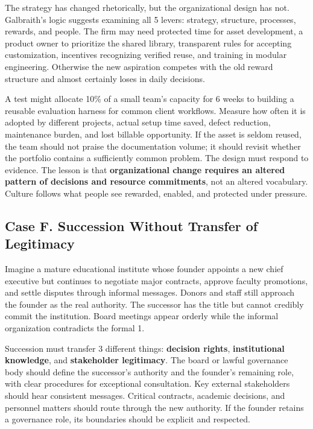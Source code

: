 The strategy has changed rhetorically, but the organizational design has not. Galbraith's logic suggests examining all 5 levers: strategy, structure, processes, rewards, and people. The firm may need protected time for asset development, a product owner to prioritize the shared library, transparent rules for accepting customization, incentives recognizing verified reuse, and training in modular engineering. Otherwise the new aspiration competes with the old reward structure and almost certainly loses in daily decisions.

A test might allocate 10\% of a small team's capacity for 6 weeks to building a reusable evaluation harness for common client workflows. Measure how often it is adopted by different projects, actual setup time saved, defect reduction, maintenance burden, and lost billable opportunity. If the asset is seldom reused, the team should not praise the documentation volume; it should revisit whether the portfolio contains a sufficiently common problem. The design must respond to evidence. The lesson is that \textbf{organizational change requires an altered pattern of decisions and resource commitments}, not an altered vocabulary. Culture follows what people see rewarded, enabled, and protected under pressure.

\subsection*{Case F. Succession Without Transfer of Legitimacy}

Imagine a mature educational institute whose founder appoints a new chief executive but continues to negotiate major contracts, approve faculty promotions, and settle disputes through informal messages. Donors and staff still approach the founder as the real authority. The successor has the title but cannot credibly commit the institution. Board meetings appear orderly while the informal organization contradicts the formal 1.

Succession must transfer 3 different things: \textbf{decision rights}, \textbf{institutional knowledge}, and \textbf{stakeholder legitimacy}. The board or lawful governance body should define the successor's authority and the founder's remaining role, with clear procedures for exceptional consultation. Key external stakeholders should hear consistent messages. Critical contracts, academic decisions, and personnel matters should route through the new authority. If the founder retains a governance role, its boundaries should be explicit and respected.

